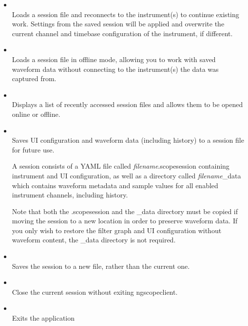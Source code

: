 \begin{itemize}

\item {}\\
Loads a session file and reconnects to the instrument(s) to continue existing work. Settings from the saved
session will be applied and overwrite the current channel and timebase configuration of the instrument, if different.

\item {}\\
Loads a session file in offline mode, allowing you to work with saved waveform data without connecting to the
instrument(s) the data was captured from.

\item {}\\
Displays a list of recently accessed session files and allows them to be opened online or offline.

\item {}\\
Saves UI configuration and waveform data (including history) to a session file for future use.

A session consists of a YAML file called \emph{filename}.scopesession containing instrument and UI configuration, as
well as a directory called \emph{filename}\_data which contains waveform metadata and sample values for all enabled
instrument channels, including history.

Note that both the .scopesession and the \_data directory must be copied if moving the session to a new location in
order to preserve waveform data. If you only wish to restore the filter graph and UI configuration without waveform
content, the \_data directory is not required.

\item {}\\
Saves the session to a new file, rather than the current one.

\item {}\\
Close the current session without exiting ngscopeclient.

\item {}\\
Exits the application

\end{itemize}

